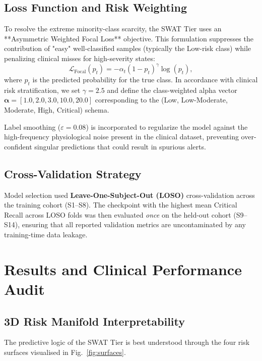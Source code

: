 \documentclass[conference]{IEEEtran}
\begin{document}
\subsection{Loss Function and Risk Weighting}
To resolve the extreme minority-class scarcity, the SWAT Tier uses an **Asymmetric Weighted Focal Loss** objective. This formulation suppresses the contribution of "easy" well-classified samples (typically the Low-risk class) while penalizing clinical misses for high-severity states:
\begin{equation}
  \mathcal{L}_\mathrm{Focal}(p_t) = -\alpha_t (1 - p_t)^\gamma \log(p_t),
  \label{eq:focal}
\end{equation}
where $p_t$ is the predicted probability for the true class. In accordance with clinical risk stratification, we set $\gamma = 2.5$ and define the class-weighted alpha vector $\boldsymbol{\alpha} = [1.0, 2.0, 3.0, 10.0, 20.0]$ corresponding to the (Low, Low-Moderate, Moderate, High, Critical) schema. 

Label smoothing ($\varepsilon = 0.08$) is incorporated to regularize the model against the high-frequency physiological noise present in the clinical dataset, preventing over-confident singular predictions that could result in spurious alerts.

\subsection{Cross-Validation Strategy}
Model selection used \textbf{Leave-One-Subject-Out (LOSO)}
cross-validation across the training cohort (S1--S8).  The checkpoint
with the highest mean Critical Recall across LOSO folds was then
evaluated \textit{once} on the held-out cohort (S9--S14), ensuring
that all reported validation metrics are uncontaminated by any
training-time data leakage.

\section{Results and Clinical Performance Audit}

\subsection{3D Risk Manifold Interpretability}
The predictive logic of the SWAT Tier is best understood through the
four risk surfaces visualised in Fig.~\ref{fig:surfaces}.
\end{document}
